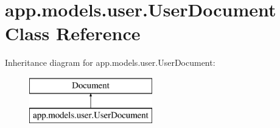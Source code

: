 \hypertarget{classapp_1_1models_1_1user_1_1_user_document}{}\section{app.\+models.\+user.\+User\+Document Class Reference}
\label{classapp_1_1models_1_1user_1_1_user_document}
Inheritance diagram for app.\+models.\+user.\+User\+Document\+:\begin{figure}[H]
\begin{center}
\leavevmode
\includegraphics[height=2.000000cm]{classapp_1_1models_1_1user_1_1_user_document}
\end{center}
\end{figure}
